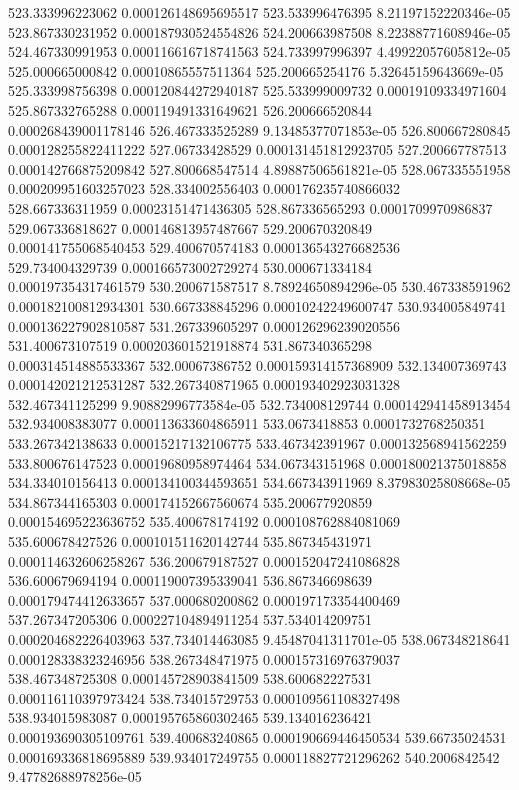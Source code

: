 {523.333996223062 0.000126148695695517
523.533996476395 8.21197152220346e-05
523.867330231952 0.000187930524554826
524.200663987508 8.22388771608946e-05
524.467330991953 0.000116616718741563
524.733997996397 4.49922057605812e-05
525.000665000842 0.00010865557511364
525.200665254176 5.32645159643669e-05
525.333998756398 0.000120844272940187
525.533999009732 0.00019109334971604
525.867332765288 0.000119491331649621
526.200666520844 0.000268439001178146
526.467333525289 9.13485377071853e-05
526.800667280845 0.000128255822411222
527.06733428529 0.000131451812923705
527.200667787513 0.000142766875209842
527.800668547514 4.89887506561821e-05
528.067335551958 0.000209951603257023
528.334002556403 0.000176235740866032
528.667336311959 0.00023151471436305
528.867336565293 0.0001709970986837
529.067336818627 0.000146813957487667
529.200670320849 0.000141755068540453
529.400670574183 0.000136543276682536
529.734004329739 0.000166573002729274
530.000671334184 0.000197354317461579
530.200671587517 8.78924650894296e-05
530.467338591962 0.000182100812934301
530.667338845296 0.00010242249600747
530.934005849741 0.000136227902810587
531.267339605297 0.000126296239020556
531.400673107519 0.000203601521918874
531.867340365298 0.000314514885533367
532.00067386752 0.000159314157368909
532.134007369743 0.000142021212531287
532.267340871965 0.000193402923031328
532.467341125299 9.90882996773584e-05
532.734008129744 0.000142941458913454
532.934008383077 0.000113633604865911
533.0673418853 0.0001732768250351
533.267342138633 0.00015217132106775
533.467342391967 0.000132568941562259
533.800676147523 0.00019680958974464
534.067343151968 0.000180021375018858
534.334010156413 0.000134100344593651
534.667343911969 8.37983025808668e-05
534.867344165303 0.000174152667560674
535.200677920859 0.000154695223636752
535.400678174192 0.000108762884081069
535.600678427526 0.000101511620142744
535.867345431971 0.000114632606258267
536.200679187527 0.000152047241086828
536.600679694194 0.000119007395339041
536.867346698639 0.000179474412633657
537.000680200862 0.000197173354400469
537.267347205306 0.000227104894911254
537.534014209751 0.000204682226403963
537.734014463085 9.45487041311701e-05
538.067348218641 0.000128338323246956
538.267348471975 0.000157316976379037
538.467348725308 0.000145728903841509
538.600682227531 0.000116110397973424
538.734015729753 0.000109561108327498
538.934015983087 0.000195765860302465
539.134016236421 0.000193690305109761
539.400683240865 0.000190669446450534
539.66735024531 0.000169336818695889
539.934017249755 0.000118827721296262
540.2006842542 9.47782688978256e-05
}
